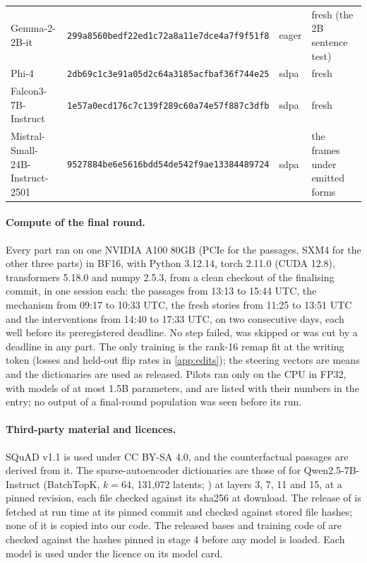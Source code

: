 \begin{table}[!ht]
{\begin{tabular}{@{}llll@{}}
Gemma-2-2B-it & \texttt{\scriptsize 299a8560bedf22ed1c72a8a11e7dce4a7f9f51f8} & eager & fresh (the 2B sentence test) \\
Phi-4 & \texttt{\scriptsize 2db69c1c3e91a05d2c64a3185acfbaf36f744e25} & sdpa & fresh \\
Falcon3-7B-Instruct & \texttt{\scriptsize 1e57a0ecd176c7c139f289c60a74e57f887c3dfb} & sdpa & fresh \\
Mistral-Small-24B-Instruct-2501 & \texttt{\scriptsize 9527884be6e5616bdd54de542f9ae13384489724} & sdpa & the frames under emitted forms \\
\bottomrule
\end{tabular}}
\end{table}

\paragraph{Compute of the final round.} Every part ran on one NVIDIA A100 80GB (PCIe for the passages, SXM4 for the other three parts) in BF16, with Python 3.12.14, torch 2.11.0 (CUDA 12.8), transformers 5.18.0 and numpy 2.5.3, from a clean checkout of the finalising commit, in one session each: the passages from 13:13 to 15:44 UTC, the mechanism from 09:17 to 10:33 UTC, the fresh stories from 11:25 to 13:51 UTC and the interventions from 14:40 to 17:33 UTC, on two consecutive days, each well before its preregistered deadline. No step failed, was skipped or was cut by a deadline in any part. The only training is the rank-16 remap fit at the writing token (losses and held-out flip rates in \cref{app:edits}); the steering vectors are means and the dictionaries are used as released. Pilots ran only on the CPU in FP32, with models of at most 1.5B parameters, and are listed with their numbers in the entry; no output of a final-round population was seen before its run. %

\paragraph{Third-party material and licences.} SQuAD v1.1 \citep{rajpurkar2016squad} is used under CC BY-SA 4.0, and the counterfactual passages are derived from it. The sparse-autoencoder dictionaries are those of \citet{andyrdt2025saes} for Qwen2.5-7B-Instruct (BatchTopK, $k = 64$, 131{,}072 latents; \citealt{bussmann2024batchtopk}) at layers 3, 7, 11 and 15, at a pinned revision, each file checked against its sha256 at download. The release of \citet{prakash2025lookbacks} is fetched at run time at its pinned commit and checked against stored file hashes; none of it is copied into our code. The released bases and training code of \citet{anonymous2026fitted} are checked against the hashes pinned in stage 4 before any model is loaded. Each model is used under the licence on its model card.

